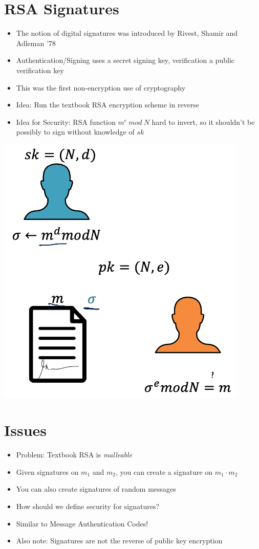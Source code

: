 \section{RSA Signatures}
    \begin{itemize}
        \item The notion of digital signatures was introduced by Rivest, Shamir and Adleman ’78
        \item Authentication/Signing uses a secret signing key, verification a public verification key
        \item This was the first non-encryption use of cryptography
        \item Idea: Run the textbook RSA encryption scheme in reverse
        \item Idea for Security: RSA function $m^e\ mod\ N$ hard to invert, so it shouldn’t be possibly to sign without knowledge of $sk$
    \end{itemize}
    \begin{center}
	    \includegraphics[width=120mm]{Graphics/Digital Signatures/ds2.png}
    \end{center}

\section{Issues}
    \begin{itemize}
        \item Problem: Textbook RSA is \textit{malleable}
        \item Given signatures on $m_1$ and $m_2$, you can create a signature on $m_1 \cdot m_2$
        \item You can also create signatures of random messages
        \item How should we define security for signatures?
        \item Similar to Message Authentication Codes!
        \item Also note: Signatures are not the reverse of public key encryption
    \end{itemize}

